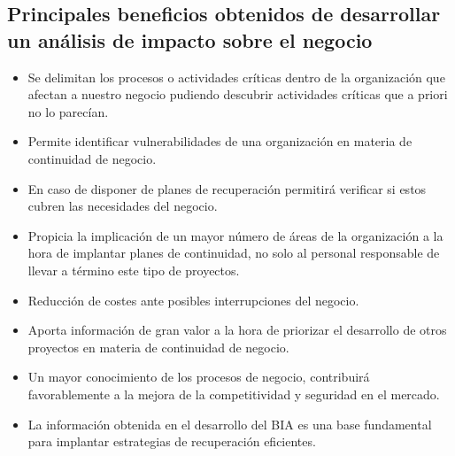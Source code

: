 \documentclass[conference]{IEEEtran}
\begin{document}
\subsection{Principales beneficios obtenidos de desarrollar un análisis de impacto sobre el negocio}
\begin{itemize}
    \item Se delimitan los procesos o actividades críticas dentro de la organización que afectan a nuestro negocio pudiendo descubrir actividades críticas que a priori no lo parecían.
    \item Permite identificar vulnerabilidades de una organización en materia de continuidad de negocio.
    \item En caso de disponer de planes de recuperación permitirá verificar si estos cubren las necesidades del negocio.
    \item Propicia la implicación de un mayor número de áreas de la organización a la hora de implantar planes de continuidad, no solo al personal responsable de llevar a término este tipo de proyectos.
    \item Reducción de costes ante posibles interrupciones del negocio.
    \item Aporta información de gran valor a la hora de priorizar el desarrollo de otros proyectos en materia de continuidad de negocio.
    \item Un mayor conocimiento de los procesos de negocio, contribuirá favorablemente a la mejora de la competitividad y seguridad en el mercado.
    \item La información obtenida en el desarrollo del BIA es una base fundamental para implantar estrategias de recuperación eficientes.
\end{itemize}
\end{document}

